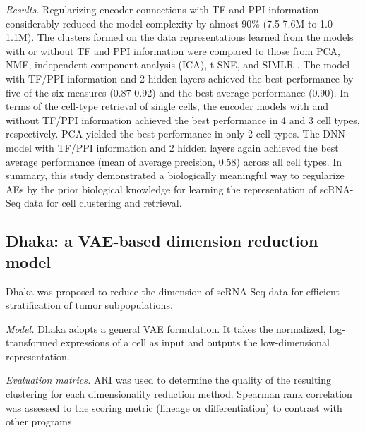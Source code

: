 \documentclass[
]{book}
\begin{document}
\emph{Results.} Regularizing encoder connections with TF and PPI information considerably reduced the model complexity by almost 90\% (7.5-7.6M to 1.0-1.1M). The clusters formed on the data representations learned from the models with or without TF and PPI information were compared to those from PCA, NMF, independent component analysis (ICA), t-SNE, and SIMLR \citep{RN38}. The model with TF/PPI information and 2 hidden layers achieved the best performance by five of the six measures (0.87-0.92) and the best average performance (0.90). In terms of the cell-type retrieval of single cells, the encoder models with and without TF/PPI information achieved the best performance in 4 and 3 cell types, respectively. PCA yielded the best performance in only 2 cell types. The DNN model with TF/PPI information and 2 hidden layers again achieved the best average performance (mean of average precision, 0.58) across all cell types. In summary, this study demonstrated a biologically meaningful way to regularize AEs by the prior biological knowledge for learning the representation of scRNA-Seq data for cell clustering and retrieval.

\hypertarget{ch-5-3-2}{%
\subsection{Dhaka: a VAE-based dimension reduction model}\label{ch-5-3-2}}

Dhaka \citep{RN125} was proposed to reduce the dimension of scRNA-Seq data for efficient stratification of tumor subpopulations.

\emph{Model.} Dhaka adopts a general VAE formulation. It takes the normalized, log-transformed expressions of a cell as input and outputs the low-dimensional representation.

\emph{Evaluation matrics.} ARI was used to determine the quality of the resulting clustering for each dimensionality reduction method. Spearman rank correlation was assessed to the scoring metric (lineage or differentiation) to contrast with other programs.
\end{document}
